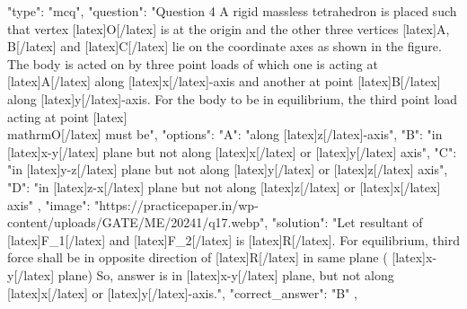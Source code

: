   {
    "type": "mcq",
    "question": "Question 4 A rigid massless tetrahedron is placed such that vertex [latex]O[/latex] is at the origin and the other three vertices [latex]A, B[/latex] and [latex]C[/latex] lie on the coordinate axes as shown in the figure. The body is acted on by three point loads of which one is acting at [latex]A[/latex] along [latex]x[/latex]-axis and another at point [latex]B[/latex] along [latex]y[/latex]-axis. For the body to be in equilibrium, the third point load acting at point [latex]\\mathrm{O}[/latex] must be",
    "options": {
      "A": "along [latex]z[/latex]-axis",
      "B": "in [latex]x-y[/latex] plane but not along [latex]x[/latex] or [latex]y[/latex] axis",
      "C": "in [latex]y-z[/latex] plane but not along [latex]y[/latex] or [latex]z[/latex] axis",
      "D": "in [latex]z-x[/latex] plane but not along [latex]z[/latex] or [latex]x[/latex] axis"
    },
    "image": "https://practicepaper.in/wp-content/uploads/GATE/ME/20241/q17.webp",
    "solution": "Let resultant of [latex]F_{1}[/latex] and [latex]F_{2}[/latex] is [latex]R[/latex]. For equilibrium, third force shall be in opposite direction of [latex]R[/latex] in same plane ( [latex]x-y[/latex] plane) So, answer is in [latex]x-y[/latex] plane, but not along [latex]x[/latex] or [latex]y[/latex]-axis.",
    "correct_answer": "B"
  },
